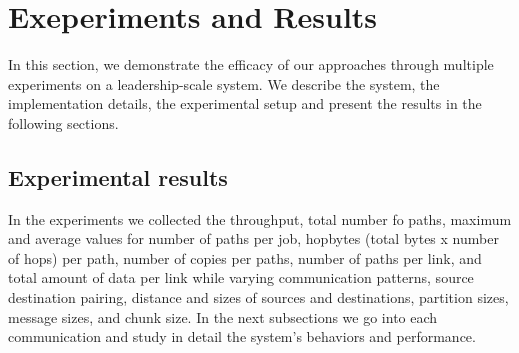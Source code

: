 \section{Exeperiments and Results}
\label{sec:benchmark}

In this section, we demonstrate the efficacy of our approaches through multiple experiments on a leadership-scale system. We describe the system, the implementation details, the experimental setup and present the results in the following sections.






\subsection{Experimental results}
\label{sec:results}

In the experiments we collected the throughput, total number fo paths, maximum and average values for number of paths per job, hopbytes (total bytes x number of hops) per path, number of copies per paths, number of paths per link, and total amount of data per link while varying communication patterns, source destination pairing, distance and sizes of sources and destinations, partition sizes, message sizes, and chunk size.
In the next subsections we go into each communication and study in detail the system's behaviors and performance.





















